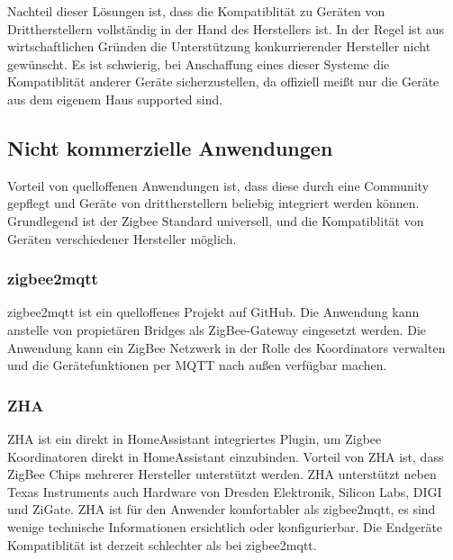 Nachteil dieser Lösungen ist, dass die Kompatiblität zu Geräten von Drittherstellern vollständig in der Hand des Herstellers ist. In der Regel ist aus
wirtschaftlichen Gründen die Unterstützung konkurrierender Hersteller nicht gewünscht. Es ist schwierig, bei Anschaffung eines dieser Systeme die Kompatiblität
anderer Geräte sicherzustellen, da offiziell meißt nur die Geräte aus dem eigenem Haus supported sind.

\subsection{Nicht kommerzielle Anwendungen}

Vorteil von quelloffenen Anwendungen ist, dass diese durch eine Community gepflegt und Geräte von drittherstellern beliebig integriert werden können.
Grundlegend ist der Zigbee Standard universell, und die Kompatiblität von Geräten verschiedener Hersteller möglich.

\subsubsection{zigbee2mqtt}

zigbee2mqtt \cite{z2m} ist ein quelloffenes Projekt auf GitHub. Die Anwendung kann anstelle von propietären Bridges als ZigBee-Gateway
eingesetzt werden. Die Anwendung kann ein ZigBee Netzwerk in der Rolle des Koordinators verwalten und die Gerätefunktionen per MQTT nach außen verfügbar machen.

\subsubsection{ZHA}
ZHA ist ein direkt in HomeAssistant integriertes Plugin, um Zigbee Koordinatoren direkt in HomeAssistant einzubinden. Vorteil
von ZHA ist, dass ZigBee Chips mehrerer Hersteller unterstützt werden. ZHA unterstützt neben Texas Instruments auch Hardware von Dresden Elektronik,
Silicon Labs, DIGI und ZiGate. ZHA ist für den Anwender komfortabler als zigbee2mqtt, es sind wenige technische Informationen ersichtlich oder konfigurierbar.
Die Endgeräte Kompatiblität ist derzeit schlechter als bei zigbee2mqtt.







